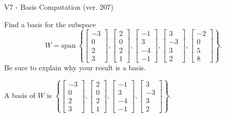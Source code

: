 \begin{exercise}
  \begin{exerciseTitle}V7 - Basis Computation (ver. 207)\end{exerciseTitle}
  \begin{exerciseStatement}
    Find a basis for the subspace 
\[W=\mathrm{span}\ \left\{\left[\begin{array}{r}
-3 \\
0 \\
2 \\
3
\end{array}\right] , \left[\begin{array}{r}
2 \\
0 \\
2 \\
1
\end{array}\right] , \left[\begin{array}{r}
-1 \\
3 \\
-4 \\
-1
\end{array}\right] , \left[\begin{array}{r}
3 \\
-3 \\
3 \\
2
\end{array}\right] , \left[\begin{array}{r}
-2 \\
0 \\
5 \\
8
\end{array}\right]\right\}.\]
 Be sure to explain why your result is a basis.


  \end{exerciseStatement}
  \begin{exerciseAnswer}
   A basis of \(W\) is  \(\left\{\left[\begin{array}{r}
-3 \\
0 \\
2 \\
3
\end{array}\right] , \left[\begin{array}{r}
2 \\
0 \\
2 \\
1
\end{array}\right] , \left[\begin{array}{r}
-1 \\
3 \\
-4 \\
-1
\end{array}\right] , \left[\begin{array}{r}
3 \\
-3 \\
3 \\
2
\end{array}\right]\right\}\).
  


  \end{exerciseAnswer}
\end{exercise}